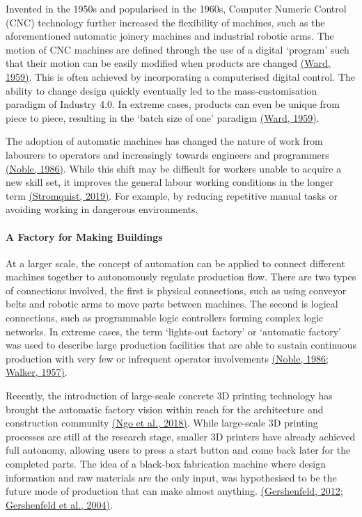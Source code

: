 \documentclass[11pt]{book}
\begin{document}
Invented in the 1950s and popularised in the 1960s, Computer Numeric Control (CNC) technology further increased the flexibility of machines, such as the aforementioned automatic joinery machines and industrial robotic arms. The motion of CNC machines are defined through the use of a digital ‘program’ such that their motion can be easily modified when products are changed \href{https://www.zotero.org/google-docs/?zaXN8V}{(Ward, 1959)}. This is often achieved by incorporating a computerised digital control. The ability to change design quickly eventually led to the mass-customisation paradigm of Industry 4.0. In extreme cases, products can even be unique from piece to piece, resulting in the ‘batch size of one’ paradigm \href{https://www.zotero.org/google-docs/?zgkMNk}{(Ward, 1959)}.

The adoption of automatic machines has changed the nature of work from labourers to operators and increasingly towards engineers and programmers \href{https://www.zotero.org/google-docs/?iYzGBf}{(Noble, 1986)}. While this shift may be difficult for workers unable to acquire a new skill set, it improves the general labour working conditions in the longer term \href{https://www.zotero.org/google-docs/?RBFbyp}{(Stromquist, 2019)}. For example, by reducing repetitive manual tasks or avoiding working in dangerous environments. 

\paragraph{A Factory for Making Buildings}

At a larger scale, the concept of automation can be applied to connect different machines together to autonomously regulate production flow. There are two types of connections involved, the first is physical connections, such as using conveyor belts and robotic arms to move parts between machines. The second is logical connections, such as programmable logic controllers forming complex logic networks. In extreme cases, the term ‘lights-out factory’ or ‘automatic factory’ was used to describe large production facilities that are able to sustain continuous production with very few or infrequent operator involvements \href{https://www.zotero.org/google-docs/?1vGmg1}{(Noble, 1986; Walker, 1957)}. 

Recently, the introduction of large-scale concrete 3D printing technology has brought the automatic factory vision within reach for the architecture and construction community \href{https://www.zotero.org/google-docs/?rmNu2g}{(Ngo et al., 2018)}. While large-scale 3D printing processes are still at the research stage, smaller 3D printers have already achieved full autonomy, allowing users to press a start button and come back later for the completed parts. The idea of a black-box fabrication machine where design information and raw materials are the only input, was hypothesised to be the future mode of production that can make almost anything. \href{https://www.zotero.org/google-docs/?YpV7gl}{(Gershenfeld, 2012; Gershenfeld et al., 2004)}.  
\end{document}
